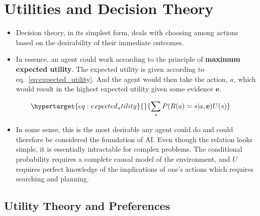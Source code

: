 \documentclass[
]{book}
\providecommand{\tightlist}{%
  \setlength{\itemsep}{0pt}\setlength{\parskip}{0pt}}
\begin{document}
\hypertarget{utilities-and-decision-theory}{%
\chapter{Utilities and Decision
Theory}\label{utilities-and-decision-theory}}

\begin{itemize}
\tightlist
\item
  Decision theory, in its simplest form, deals with choosing among
  actions based on the desirability of their immediate outcomes.
\item
  In essence, an agent could work according to the principle of
  \textbf{maximum expected utility}. The expected utility is given
  according to eq.~\ref{eq:expected_utility}. And the agent would then
  take the action, \(a\), which would result in the highest expected
  utility given some evidence \(\mathbf{e}\).
\end{itemize}

\begin{equation}\protect\hypertarget{eq:expected_utility}{}{
\sum_s P(R(a) = s | a, \mathbf{e}) U(s)
}\label{eq:expected_utility}\end{equation}

\begin{itemize}
\tightlist
\item
  In some sense, this is the most desirable any agent could do and could
  therefore be considered the foundation of AI. Even though the relation
  looks simple, it is essentially intractable for complex problems. The
  conditional probability requires a complete causal model of the
  environment, and \(U\) requires perfect knowledge of the implications
  of one's actions which requires searching and planning.
\end{itemize}

\hypertarget{utility-theory-and-preferences}{%
\section{Utility Theory and
Preferences}\label{utility-theory-and-preferences}}
\end{document}
